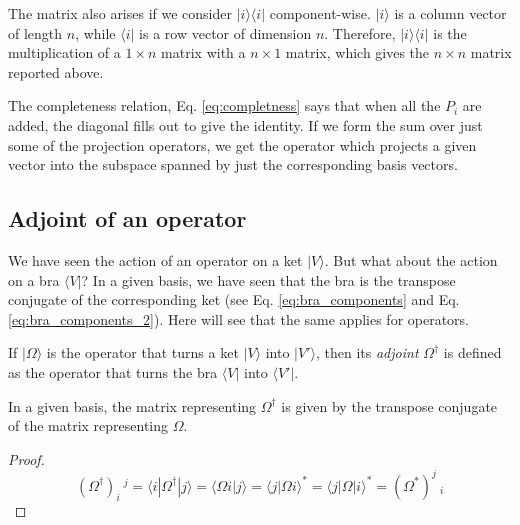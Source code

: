 \documentclass[11pt,fleqn]{book} %
\newcommand{\bra}[1]{\langle #1|}
\newcommand{\ket}[1]{| #1\rangle}
\newcommand{\scalar}[2]{\langle #1| #2\rangle}
\begin{document}
The matrix also arises if we consider $\ket{i}\bra{i}$ component-wise. $\ket{i}$ is a column vector of length $n$, while $\bra{i}$ 
is a row vector of dimension $n$. Therefore, $\ket{i}\bra{i}$ is the multiplication of a $1\times n$ matrix with a $n\times 1$ matrix,
which gives the $n\times n$ matrix reported above.

\begin{remark}
    The completeness relation, Eq. \ref{eq:completness} says that when all the $P_i$ are added, the diagonal fills out to give the
    identity. If we form the sum over just some of the projection operators, we get the operator which projects a given vector into the 
    subspace spanned by just the corresponding basis vectors.
\end{remark}

\subsection{Adjoint of an operator}
We have seen the action of an operator on a ket $\ket{V}$. But what about the action on a bra $\bra{V}$?
In a given basis, we have seen that the bra is the transpose conjugate of the corresponding ket (see Eq. \ref{eq:bra_components}
and Eq. \ref{eq:bra_components_2}). Here will see that the same applies for operators.

\begin{definition}[Adjoint]
    If $\ket{\Omega}$ is the operator that turns a ket $\ket{V}$ into $\ket{V'}$, then its \textit{adjoint} $\Omega^\dagger$ is 
    defined as the operator that turns the bra $\bra{V}$ into $\bra{V'}$.
\end{definition}
\begin{theorem}
    In a given basis, the matrix representing $\Omega^\dagger$ is given by the transpose conjugate of the matrix
    representing $\Omega$.
\end{theorem}
\begin{proof}
    \begin{equation*}
        \left(\Omega^\dagger\right)_i\:^j = \bra{i}\Omega^\dagger\ket{j} = \scalar{\Omega i}{j} = \scalar{j}{\Omega i}^* = 
        \bra{j}\Omega\ket{i}^* = \left(\Omega^*\right)^j\:_i
    \end{equation*}
\end{proof}
\end{document}
